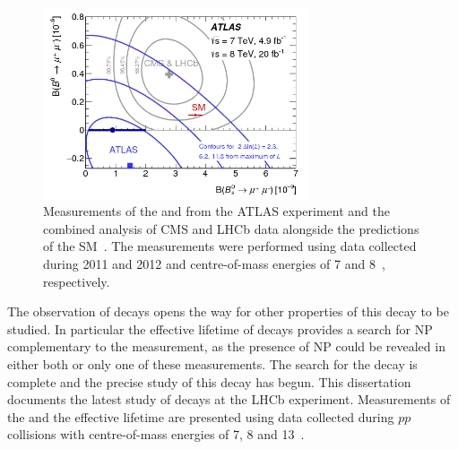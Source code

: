\begin{figure}[tbp]
    \centering
        \includegraphics[width=0.7\textwidth]{./Figs/Introduction/contour_plot.png}
        \caption{Measurements of the \bdmumu \BF and \bsmumu \BF from the ATLAS experiment and the combined analysis of CMS and LHCb data alongside the predictions of the SM~\cite{Aaboud:2016ire}. The measurements were performed using data collected during 2011 and 2012 and centre-of-mass energies of 7 and 8~\tev, respectively.}
        \label{fig:contour}
\end{figure}

The observation of \bsmumu decays opens the way for other properties of this decay to be studied. In particular the effective lifetime of \bsmumu decays provides a search for NP complementary to the \BF measurement, as the presence of NP could be revealed in either both or only one of these measurements. The search for the \bsmumu decay is complete and the precise study of this decay has begun.
This dissertation documents the latest study of \bmumu decays at the LHCb experiment. Measurements of the \bmumu \BF and the \bsmumu effective lifetime are presented using data collected during $pp$ collisions with centre-of-mass energies of 7, 8 and 13~\tev. %

